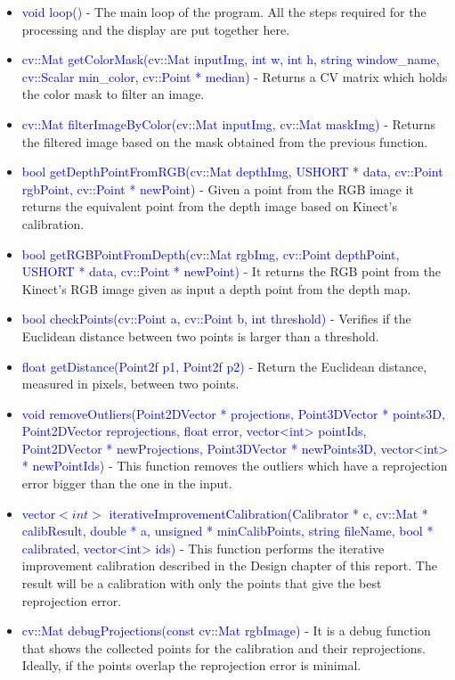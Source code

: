 \begin{itemize}
	\item \textcolor{blue}{void loop()} - The main loop of the program. All the steps required for the processing and the display are put together here.  
	\item \textcolor{blue}{cv::Mat getColorMask(cv::Mat inputImg, int w, int h, string window\_name, cv::Scalar min\_color, cv::Point * median)} - Returns a CV matrix which holds the color mask to filter an image. 
	\item \textcolor{blue}{cv::Mat filterImageByColor(cv::Mat inputImg, cv::Mat maskImg)} - Returns the filtered image based on the mask obtained from the previous function. 
	\item \textcolor{blue}{bool getDepthPointFromRGB(cv::Mat depthImg, USHORT * data, cv::Point rgbPoint, cv::Point * newPoint)} - Given a point from the RGB image it returns the equivalent point from the depth image based on Kinect's calibration. 
	\item \textcolor{blue}{bool getRGBPointFromDepth(cv::Mat rgbImg, cv::Point depthPoint, USHORT * data, cv::Point * newPoint)} - It returns the RGB point from the Kinect's RGB image given as input a depth point from the depth map.
	\item \textcolor{blue}{bool checkPoints(cv::Point a, cv::Point b, int threshold)} - Verifies if the Euclidean distance between two points is larger than a threshold. 
	\item \textcolor{blue}{float getDistance(Point2f p1, Point2f p2)} - Return the Euclidean distance, measured in pixels, between two points. 
	\item \textcolor{blue}{void removeOutliers(Point2DVector * projections, Point3DVector * points3D, Point2DVector reprojections, float error, vector<int> pointIds, Point2DVector * newProjections, Point3DVector * newPoints3D, vector<int> * newPointIds)} - This function removes the outliers which have a reprojection error bigger than the one in the input. 
	\item \textcolor{blue}{vector$<int>$ iterativeImprovementCalibration(Calibrator * c, cv::Mat * calibResult, double * a, unsigned * minCalibPoints, string fileName, bool * calibrated, vector<int> ids)} - This function performs the iterative improvement calibration described in the Design chapter of this report. The result will be a calibration with only the points that give the best reprojection error. 
	\item \textcolor{blue}{cv::Mat debugProjections(const cv::Mat rgbImage)} - It is a debug function that shows the collected points for the calibration and their reprojections. Ideally, if the points overlap the reprojection error is minimal. 

\end{itemize}
